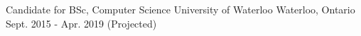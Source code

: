 


\vspace{0.5ex}


\begin{cventries}


\shortcventry                                                                                                                                                                                                                                                                                                                                                                                                                                                                                                                                                                                                                                                                                                                                                                                                                                                                                                                                                                                                                                                                                                                                                                                                                                                                                                                                                                                                                                                                                                                                                                                                                                                                                                                                                                                                                                                                                                                                                                                
{Candidate for BSc, Computer Science } %
{University of Waterloo} %
{Waterloo, Ontario} %
{Sept. 2015 - Apr. 2019 (Projected) } %


\end{cventries}
